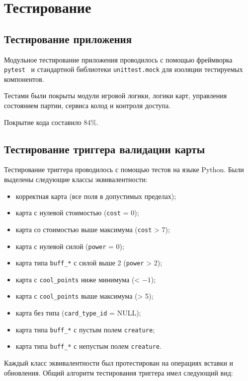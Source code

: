 \section{Тестирование}

\subsection{Тестирование приложения}

Модульное тестирование приложения проводилось с помощью фреймворка
\texttt{pytest}~\cite{pytest} и стандартной библиотеки
\texttt{unittest.mock} для изоляции тестируемых компонентов.

Тестами были покрыты модули игровой логики, логики карт, управления
состоянием партии, сервиса колод и контроля доступа.

Покрытие кода составило 84\%.

\subsection{Тестирование триггера валидации карты}

Тестирование триггера проводилось с помощью тестов на языке Python.
Были выделены следующие классы эквивалентности:

\begin{itemize}
	\item корректная карта (все поля в допустимых пределах);
	\item карта с нулевой стоимостью (\texttt{cost} = 0);
	\item карта со стоимостью выше максимума (\texttt{cost} > 7);
	\item карта с нулевой силой (\texttt{power} = 0);
	\item карта типа \texttt{buff\_*} с силой выше 2 (\texttt{power} > 2);
	\item карта с \texttt{cool\_points} ниже минимума (< $-1$);
	\item карта с \texttt{cool\_points} выше максимума (> 5);
	\item карта без типа (\texttt{card\_type\_id} = NULL);
	\item карта типа \texttt{buff\_*} с пустым полем \texttt{creature};
	\item карта типа \texttt{buff\_*} с непустым полем \texttt{creature}.
\end{itemize}

Каждый класс эквивалентности был протестирован на операциях вставки
и обновления. Общий алгоритм тестирования триггера имел следующий вид:

